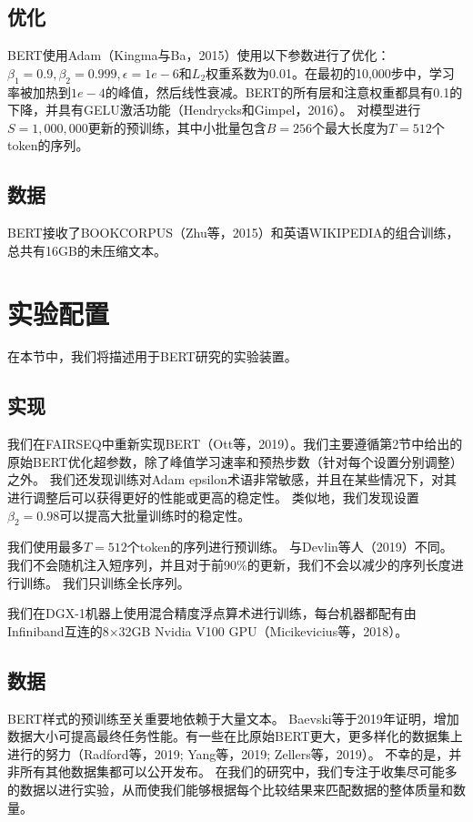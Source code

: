 \documentclass[lang=cn,11pt,a4paper,twocolumn]{elegantpaper}
\begin{document}
\subsection{优化}
BERT使用Adam（Kingma与Ba，2015）使用以下参数进行了优化：$\beta_1= 0.9,\beta_2= 0.999,\epsilon=1e-6$和$L_2$权重系数为0.01。在最初的10,000步中，学习率被加热到$1e-4$的峰值，然后线性衰减。BERT的所有层和注意权重都具有0.1的下降，并具有GELU激活功能（Hendrycks和Gimpel，2016）。 对模型进行$S = 1,000,000$更新的预训练，其中小批量包含$B = 256$个最大长度为$T = 512$个token的序列。

\subsection{数据}
BERT接收了BOOKCORPUS（Zhu等，2015）和英语WIKIPEDIA的组合训练，总共有16GB的未压缩文本。

\section{实验配置}
在本节中，我们将描述用于BERT研究的实验装置。
\subsection{实现}
我们在FAIRSEQ中重新实现BERT（Ott等，2019）。我们主要遵循第2节中给出的原始BERT优化超参数，除了峰值学习速率和预热步数（针对每个设置分别调整）之外。 我们还发现训练对Adam epsilon术语非常敏感，并且在某些情况下，对其进行调整后可以获得更好的性能或更高的稳定性。 类似地，我们发现设置$\beta_2= 0.98$可以提高大批量训练时的稳定性。

我们使用最多$T = 512$个token的序列进行预训练。 与Devlin等人（2019）不同。 我们不会随机注入短序列，并且对于前90\%的更新，我们不会以减少的序列长度进行训练。 我们只训练全长序列。

我们在DGX-1机器上使用混合精度浮点算术进行训练，每台机器都配有由Infiniband互连的8×32GB Nvidia V100 GPU（Micikevicius等，2018）。
\subsection{数据}
BERT样式的预训练至关重要地依赖于大量文本。 Baevski等于2019年证明，增加数据大小可提高最终任务性能。有一些在比原始BERT更大，更多样化的数据集上进行的努力（Radford等，2019; Yang等，2019; Zellers等，2019）。 不幸的是，并非所有其他数据集都可以公开发布。 在我们的研究中，我们专注于收集尽可能多的数据以进行实验，从而使我们能够根据每个比较结果来匹配数据的整体质量和数量。
\end{document}
